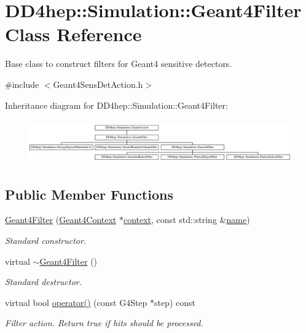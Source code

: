 \hypertarget{class_d_d4hep_1_1_simulation_1_1_geant4_filter}{}\section{D\+D4hep\+:\+:Simulation\+:\+:Geant4\+Filter Class Reference}
\label{class_d_d4hep_1_1_simulation_1_1_geant4_filter}


Base class to construct filters for Geant4 sensitive detectors.  




{\ttfamily \#include $<$Geant4\+Sens\+Det\+Action.\+h$>$}

Inheritance diagram for D\+D4hep\+:\+:Simulation\+:\+:Geant4\+Filter\+:\begin{figure}[H]
\begin{center}
\leavevmode
\includegraphics[height=1.917808cm]{class_d_d4hep_1_1_simulation_1_1_geant4_filter}
\end{center}
\end{figure}
\subsection*{Public Member Functions}
\begin{DoxyCompactItemize}
\item 
\hyperlink{class_d_d4hep_1_1_simulation_1_1_geant4_filter_a9473fedf4d296dd044a9310a9da57bb4}{Geant4\+Filter} (\hyperlink{class_d_d4hep_1_1_simulation_1_1_geant4_context}{Geant4\+Context} $\ast$\hyperlink{class_d_d4hep_1_1_simulation_1_1_geant4_action_aa9d87f0ec2a72b7fc2591b18f98d75cf}{context}, const std\+::string \&\hyperlink{class_d_d4hep_1_1_simulation_1_1_geant4_action_af374e70b014d16afb81dd9d77cc3894b}{name})
\begin{DoxyCompactList}\small\item\em Standard constructor. \end{DoxyCompactList}\item 
virtual \hyperlink{class_d_d4hep_1_1_simulation_1_1_geant4_filter_a2fdb09d7018165b25034b37fa8eb9930}{$\sim$\+Geant4\+Filter} ()
\begin{DoxyCompactList}\small\item\em Standard destructor. \end{DoxyCompactList}\item 
virtual bool \hyperlink{class_d_d4hep_1_1_simulation_1_1_geant4_filter_a373f84ddcbefe180daa058050b6cf753}{operator()} (const G4\+Step $\ast$step) const
\begin{DoxyCompactList}\small\item\em Filter action. Return true if hits should be processed. \end{DoxyCompactList}\end{DoxyCompactItemize}
